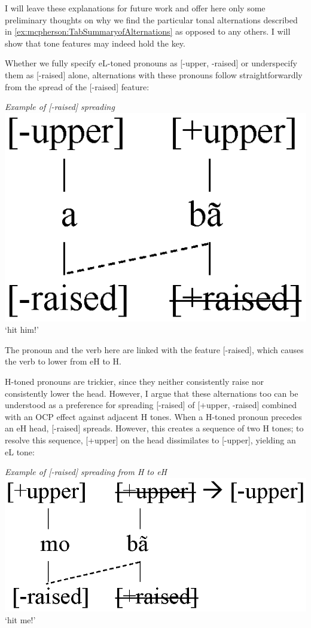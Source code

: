 \documentclass[output=paper]{langsci/langscibook}
\begin{document}
I will leave these explanations for future work and offer here only some preliminary thoughts on why we find the particular tonal alternations described in \ref{ex:mcpherson:TabSummaryofAlternations} as opposed to any others. I will show that tone features may indeed hold the key.

Whether we fully specify eL-toned pronouns as [-upper, -raised] or underspecify them as [-raised] alone, alternations with these pronouns follow straightforwardly from the spread of the [-raised] feature:

\ea\label{ex:mcpherson:22} {\it Example of [-raised] spreading} \\
\includegraphics[scale=.5]{figures/Lspread2.eps} \\
`hit him!' \\
\z

The pronoun and the verb here are linked with the feature [-raised], which causes the verb to lower from eH to H. 

H-toned pronouns are trickier, since they neither consistently raise nor consistently lower the head. However, I argue that these alternations too can be understood as a preference for spreading [-raised] of [+upper, -raised] combined with an OCP effect against adjacent H tones. When a H-toned pronoun precedes an eH head, [-raised] spreads. However, this creates a sequence of two H tones; to resolve this sequence, [+upper] on the head dissimilates to [-upper], yielding an eL tone:

\ea\label{ex:mcpherson:23} {\it Example of [-raised] spreading from H to eH} \\
\includegraphics[scale=.55]{figures/MspreadH.eps} \\
`hit me!' \\
\z
\end{document}
